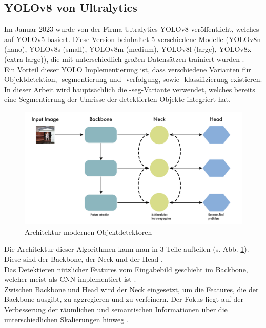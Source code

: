 	\subsection{YOLOv8 von Ultralytics}{ \label{subsec:YOLOv8_theoretic}
	
	Im Januar 2023 wurde von der Firma Ultralytics YOLOv8 veröffentlicht, welches auf YOLOv5 basiert. Diese Version beinhaltet 5 verschiedene Modelle (YOLOv8n (nano), YOLOv8s (small), YOLOv8m (medium), YOLOv8l (large), YOLOv8x (extra large)), die mit unterschiedlich großen Datensätzen trainiert wurden  \citep{Terven2023}. \\	
	Ein Vorteil dieser YOLO Implementierung ist, dass verschiedene Varianten für Ob\-jekt\-det\-ekt\-ion, -seg\-men\-tier\-ung und -ver\-fol\-gung, sowie -klas\-si\-fi\-zier\-ung existieren. In dieser Arbeit wird hauptsächlich die \glqq -seg\grqq{}-Variante verwendet, welches bereits eine Segmentierung der Umrisse der detektierten Objekte integriert hat.
	\begin{figure}[h]
		\centering
		\includegraphics*[scale = 0.20, keepaspectratio]{images/YOLO/YOLOv8_object_detector_general.png}
		\caption[Architektur modernen Objektdetektoren]{Architektur modernen Objektdetektoren \citep{Terven2023}}
		\label{YOLO_obj_det_gen}
	\end{figure}
	Die Architektur dieser Algorithmen kann man in 3 Teile aufteilen (s. Abb. \ref{YOLO_obj_det_gen}). Diese sind der Backbone, der Neck und der Head \citep{Terven2023}. \\
	Das Detektieren nützlicher Features vom Eingabebild geschieht im Backbone, welcher meist als CNN implementiert ist \citep{Terven2023}. \\
	Zwischen Backbone und Head wird der Neck eingesetzt, um die Features, die der Backbone ausgibt, zu aggregieren und zu verfeinern. Der Fokus liegt auf der Verbesserung der räumlichen und semantischen Informationen über die unterschiedlichen Skalierungen hinweg \citep{Terven2023}. \\
}
